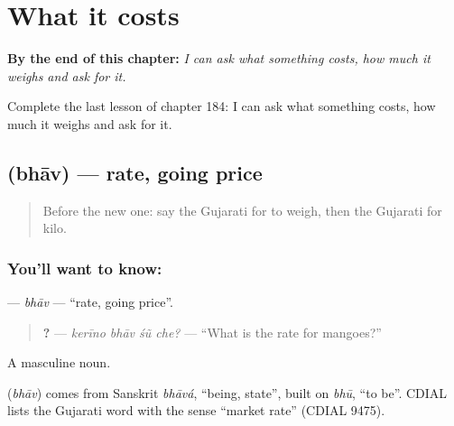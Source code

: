 
\chapter{What it costs}
\label{ch:gu-what-it-costs}

\begin{chapteropening}
\textbf{By the end of this chapter:} \emph{I can ask what something costs, how much it weighs and ask for it.}

Complete the last lesson of chapter 184: I can ask what something costs, how much it weighs and ask for it.
\end{chapteropening}

\section[\texorpdfstring{\gu{ભાવ} (bhāv)}{ભાવ (bhāv)}]{ (bhāv) — rate, going price}

\label{lesson:GU-C184-bhav}



\begin{quote}
Before the new one: say the Gujarati for to weigh, then the Gujarati for kilo.
\end{quote}

\subsection*{You'll want to know: }
\textbf{} — \emph{bhāv} — \textquotedblleft{}rate, going price\textquotedblright{}.

\begin{quote}
\textbf{   ?} — \emph{kerīno bhāv śũ che?} — \textquotedblleft{}What is the rate for mangoes?\textquotedblright{}
\end{quote}

A masculine noun.

\begin{cousinweb}
\textbf{} (\emph{bhāv}) comes from Sanskrit \emph{bhāvá}, \textquotedblleft{}being, state\textquotedblright{}, built on \emph{bhū}, \textquotedblleft{}to be\textquotedblright{}. CDIAL lists the Gujarati word with the sense \textquotedblleft{}market rate\textquotedblright{} (CDIAL 9475).
\end{cousinweb}


